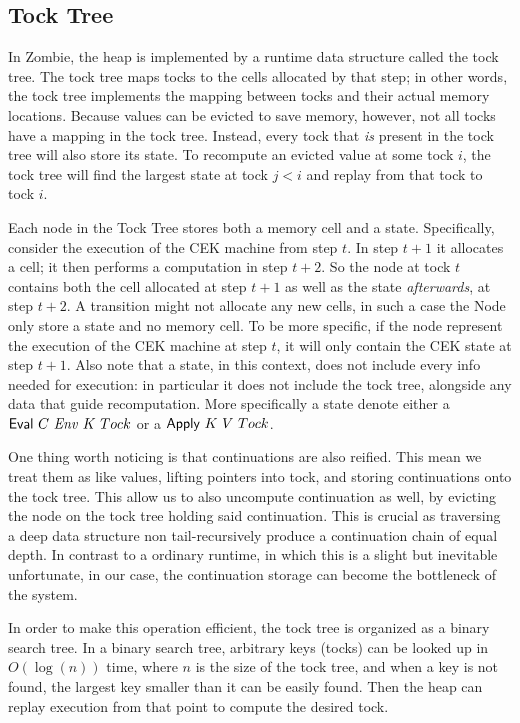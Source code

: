 \subsection{Tock Tree}
In Zombie, the heap is implemented by a runtime data structure called the tock tree. The tock tree maps tocks to the cells allocated by that step; in other words, the tock tree implements the mapping between tocks and their actual memory locations. Because values can be evicted to save memory, however, not all tocks have a mapping in the tock tree. Instead, every tock that \emph{is} present in the tock tree will also store its state. To recompute an evicted value at some tock $i$, the tock tree will find the largest state at tock $j < i$ and replay from that tock to tock $i$.

Each node in the Tock Tree stores both a memory cell and a state. Specifically, consider the execution of the CEK machine from step $t$. In step $t + 1$ it allocates a cell; it then performs a computation in step $t + 2$. So the node at tock $t$ contains both the cell allocated at step $t + 1$ as well as the state \emph{afterwards}, at step $t + 2$. A transition might not allocate any new cells, in such a case the Node only store a state and no memory cell. To be more specific, if the node represent the execution of the CEK machine at step $t$, it will only contain the CEK state at step $t + 1$. Also note that a state, in this context, does not include every info needed for execution: in particular it does not include the tock tree, alongside any data that guide recomputation. More specifically a state denote either a $\text{\textsf{Eval}}~C~\mathit{Env}~K~Tock$ or a $\text{\textsf{Apply}}~K~V~Tock$.

One thing worth noticing is that continuations are also reified. This mean we treat them as like values, lifting pointers into tock, and storing continuations onto the tock tree. This allow us to also uncompute continuation as well, by evicting the node on the tock tree holding said continuation. This is crucial as traversing a deep data structure non tail-recursively produce a continuation chain of equal depth. In contrast to a ordinary runtime, in which this is a slight but inevitable unfortunate, in our case, the continuation storage can become the bottleneck of the system.

In order to make this operation efficient, the tock tree is organized as a binary search tree. In a binary search tree, arbitrary keys (tocks) can be looked up in $O(\log(n))$ time, where $n$ is the size of the tock tree, and when a key is not found, the largest key smaller than it can be easily found. Then the heap can replay execution from that point to compute the desired tock.

